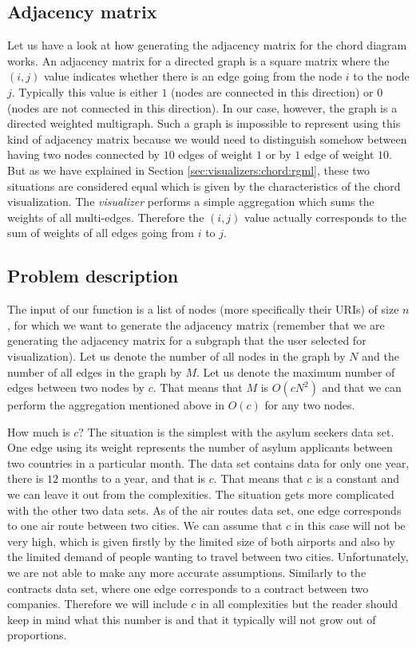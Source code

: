 \subsection{Adjacency matrix}

Let us have a look at how generating the adjacency matrix for the chord diagram works. An adjacency matrix for a directed graph is a square matrix where the $(i, j)$ value indicates whether there is an edge going from the node $i$ to the node $j$. Typically this value is either $1$ (nodes are connected in this direction) or $0$ (nodes are not connected in this direction). In our case, however, the graph is a directed weighted multigraph. Such a graph is impossible to represent using this kind of adjacency matrix because we would need to distinguish somehow between having two nodes connected by $10$ edges of weight $1$ or by $1$ edge of weight $10$.  But as we have explained in Section \ref{sec:visualizers:chord:rgml}, these two situations are considered equal which is given by the characteristics of the chord visualization. The \emph{visualizer} performs a simple aggregation which sums the weights of all multi-edges. Therefore the $(i,j)$ value actually corresponds to the sum of weights of all edges going from $i$ to $j$.

\subsection{Problem description}

The input of our function is a list of nodes (more specifically their URIs) of size $n$, for which we want to generate the adjacency matrix (remember that we are generating the adjacency matrix for a subgraph that the user selected for visualization). Let us denote the number of all nodes in the graph by $N$ and the number of all edges in the graph by $M$. Let us denote the maximum number of edges between two nodes by $c$. That means that $M$ is $O(cN^2)$ and that we can perform the aggregation mentioned above in $O(c)$ for any two nodes.

How much is $c$?  The situation is the simplest with the asylum seekers data set. One edge using its weight represents the number of asylum applicants between two countries in a particular month. The data set contains data for only one year, there is $12$ months to a year, and that is $c$. That means that $c$ is a constant and we can leave it out from the complexities. The situation gets more complicated with the other two data sets. As of the air routes data set, one edge corresponds to one air route between two cities. We can assume that $c$ in this case will not be very high, which is given firstly by the limited size of both airports and also by the limited demand of people wanting to travel between two cities. Unfortunately, we are not able to make any more accurate assumptions. Similarly to the contracts data set, where one edge corresponds to a contract between two companies. Therefore we will include $c$ in all complexities but the reader should keep in mind what this number is and that it typically will not grow out of proportions.

